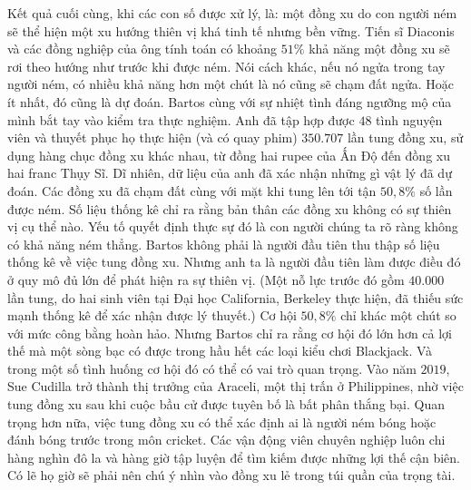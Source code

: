 \begin{multicols}{2}
	\vskip 0.1cm
	Kết quả cuối cùng, khi các con số được xử lý, là: một đồng xu do con người ném sẽ thể hiện một xu hướng thiên vị khá tinh tế nhưng bền vững. Tiến sĩ Diaconis và các đồng nghiệp của ông tính toán có khoảng $51\%$ khả năng một đồng xu sẽ rơi theo hướng như trước khi được ném. Nói cách khác, nếu nó ngửa trong tay người ném, có nhiều khả năng hơn một chút là nó cũng sẽ chạm đất ngửa. Hoặc ít nhất, đó cũng là dự đoán.
	\vskip 0.1cm
	Bartos cùng với sự nhiệt tình đáng ngưỡng mộ của mình bắt tay vào kiểm tra thực nghiệm. Anh đã tập hợp được $48$ tình nguyện viên và thuyết phục họ thực hiện (và có quay phim) $350{.}707$ lần tung đồng xu, sử dụng hàng chục đồng xu khác nhau, từ đồng hai rupee của Ấn Độ đến đồng xu hai franc Thụy Sĩ. Dĩ nhiên, dữ liệu của anh  đã xác nhận những gì vật lý đã dự đoán. Các đồng xu đã chạm đất cùng với mặt khi tung lên tới tận $50,8\%$ số lần được ném.
	\vskip 0.1cm
	Số liệu thống kê chỉ ra rằng bản thân các đồng xu không có sự thiên vị cụ thể nào. Yếu tố quyết định thực sự đó là con người chúng ta rõ ràng không có khả năng ném thẳng.  Bartos không phải là người đầu tiên thu thập số liệu thống kê về việc tung đồng xu. Nhưng anh ta là người đầu tiên làm được điều đó ở quy mô đủ lớn để phát hiện ra sự thiên vị. (Một nỗ lực trước đó gồm $40{.}000$ lần tung, do hai sinh viên tại Đại học California, Berkeley thực hiện, đã thiếu sức mạnh thống kê để xác nhận được  lý thuyết.)
	\vskip 0.1cm
	Cơ hội $50,8\%$ chỉ khác một chút so với mức công bằng hoàn hảo. Nhưng  Bartos chỉ ra rằng cơ hội đó lớn hơn cả  lợi thế mà một sòng bạc có được trong hầu hết các loại kiểu chơi Blackjack. Và trong một số tình huống cơ hội đó có thể có vai trò quan trọng. Vào năm $2019$, Sue Cudilla trở thành thị trưởng của Araceli, một thị trấn ở Philippines, nhờ việc tung đồng xu sau khi cuộc bầu cử được tuyên bố là bất phân thắng bại. Quan trọng hơn nữa, việc tung đồng xu có thể xác định ai là người ném bóng hoặc đánh bóng trước trong môn cricket. Các vận động viên chuyên nghiệp luôn chi hàng nghìn đô la và hàng giờ tập luyện để tìm kiếm được những lợi thế cận biên. Có lẽ họ giờ  sẽ phải nên chú ý nhìn vào đồng xu lẻ trong túi quần của trọng tài.
\end{multicols}